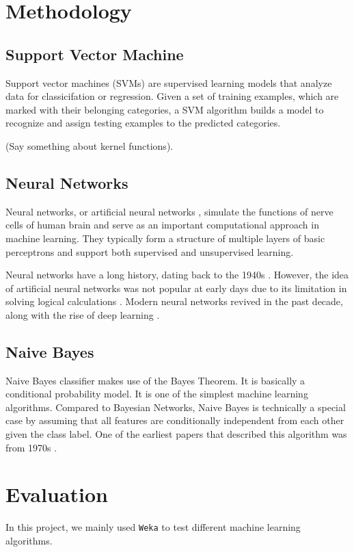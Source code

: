 \documentclass[11pt]{article}
\begin{document}
\section{Methodology}\label{sec:metho}

\subsection{Support Vector Machine}
Support vector machines (SVMs) \cite{cortes1995support} are supervised learning models that analyze data for classicifation or regression. Given a set of training examples, which are marked with their belonging categories, a SVM algorithm builds a model to recognize and assign testing examples to the predicted categories. 

(Say something about kernel functions).

\subsection{Neural Networks}
Neural networks, or artificial neural networks \cite{hagan1996neural}, simulate the functions of nerve cells of human brain and serve as an important computational approach in machine learning. They typically form a structure of multiple layers of basic perceptrons and support both supervised and unsupervised learning.

Neural networks have a long history, dating back to the 1940s \cite{mcculloch1943logical}. However, the idea of artificial neural networks was not popular at early days due to its limitation in solving logical calculations \cite{minsky1988perceptrons}. Modern neural networks revived in the past decade, along with the rise of deep learning \cite{bengio2009learning, schmidhuber2015deep}.

\subsection{Naive Bayes}
Naive Bayes classifier makes use of the Bayes Theorem. It is basically a conditional probability model. It is one of the simplest machine learning algorithms. Compared to Bayesian Networks, Naive Bayes is technically a special case by assuming that all features are conditionally independent from each other given the class label. One of the earliest papers that described this algorithm was from 1970s \cite{duda1973pattern}. 

\section{Evaluation}
In this project, we mainly used \texttt{Weka} \cite{hall2009weka} to test different machine learning algorithms.
\end{document}
